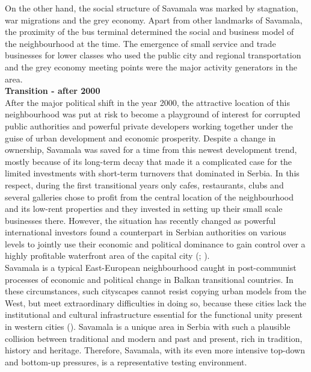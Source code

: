 \documentclass[11pt]{report}
\begin{document}
{{{{On the other hand, the social structure of Savamala was marked by stagnation, war migrations and the grey economy. Apart from other landmarks of Savamala, the proximity of the bus terminal determined the social and business model of the neighbourhood at the time. The emergence of small service and trade businesses for lower classes who used the public city and regional transportation and the grey economy meeting points were the major activity generators in the area.
\\
\textbf{Transition - after 2000}
\\
After the major political shift in the year 2000, the attractive location of this neighbourhood was put at risk to become a playground of interest for corrupted public authorities and powerful private developers working together under the guise of urban development and economic prosperity.  Despite a change in ownership, Savamala was saved for a time from this newest development trend, mostly because of its long-term decay that made it a complicated case for the limited investments with short-term turnovers that dominated in Serbia. In this respect, during the first transitional years only cafes, restaurants, clubs and several galleries chose to profit from the central location of the neighbourhood and its low-rent properties and they invested in setting up their small scale businesses there.   However,  the situation has recently changed as powerful international investors found a counterpart in Serbian authorities on various levels to jointly use their economic and political dominance to gain control over a highly profitable waterfront area of the capital city (\href{Zekovic}{\citealt{zekovic_spatial_2015}}; \href{Zekovic}{\citealt{zekovic_megaprojects_2016}}).
\\

Savamala is a typical East-European neighbourhood caught in post-communist processes of economic and political change in Balkan transitional countries.
In these circumstances, such cityscapes cannot resist copying urban models from the West, but meet extraordinary difficulties in doing so, because these cities lack the institutional and cultural infrastructure essential for the functional unity present in western cities (\href{Petrovic}{\citealt{petrovic_cities_2009}}).
Savamala is a unique area in Serbia with such a plausible collision between traditional and modern and past and present, rich in tradition, history and heritage. Therefore, Savamala, with its even more intensive top-down and bottom-up pressures, is a representative testing environment.

}}}}
\end{document}
